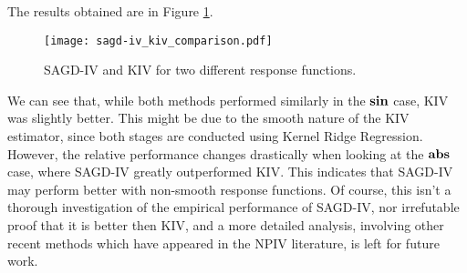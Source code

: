 The results obtained are in Figure \ref{fig: sagd-iv and kiv}.
\begin{figure}[htb]
    \begin{center}
        \texttt{[image: sagd-iv\_kiv\_comparison.pdf]}
    \end{center}
    \caption{
    SAGD-IV and KIV for two different response functions.
}
    \label{fig: sagd-iv and kiv}
\end{figure}
We can see that, while both methods performed similarly in the $ \operatorname{\textbf{sin}} $ case, KIV was slightly better.
This might be due to the smooth nature of the KIV estimator, since both stages are conducted using Kernel Ridge Regression.
However, the relative performance changes drastically when looking at the $ \operatorname{\textbf{abs}} $ case, where SAGD-IV greatly outperformed KIV.
This indicates that SAGD-IV may perform better with non-smooth response functions.
Of course, this isn't a thorough investigation of the empirical performance of SAGD-IV, nor irrefutable proof that it is better then KIV, and a more detailed analysis, involving other recent methods which have appeared in the NPIV literature, is left for future work.
